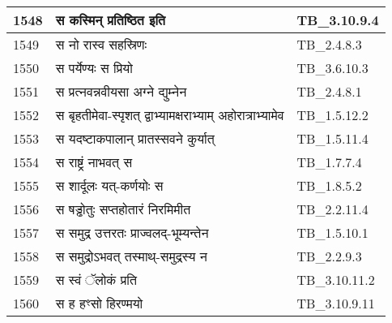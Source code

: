 \documentclass[17pt]{extarticle}
\begin{document}
\begin{longtable}{||p{0.4in}||p{4.9in}||p{0.9in}||}
    \hline
        
    1548 & स कस्मिन् प्रतिष्ठित इति & TB\_3.10.9.4       \\
    
    \hline
        
    1549 & स नो रास्व सहस्रिणः & TB\_2.4.8.3       \\
    
    \hline
        
    1550 & स पर्येण्यः स प्रियो & TB\_3.6.10.3       \\
    
    \hline
        
    1551 & स प्रत्नवन्नवीयसा अग्ने द्युम्नेन & TB\_2.4.8.1       \\
    
    \hline
        
    1552 & स बृहतीमेवा{-}स्पृशत् द्वाभ्यामक्षराभ्याम् अहोरात्राभ्यामेव & TB\_1.5.12.2       \\
    
    \hline
        
    1553 & स यदष्टाकपालान् प्रातस्सवने कुर्यात् & TB\_1.5.11.4       \\
    
    \hline
        
    1554 & स राष्ट्रं नाभवत् स & TB\_1.7.7.4       \\
    
    \hline
        
    1555 & स शार्दूलः यत्{-}कर्णयोः स & TB\_1.8.5.2       \\
    
    \hline
        
    1556 & स षड्ढोतुः सप्तहोतारं निरमिमीत & TB\_2.2.11.4       \\
    
    \hline
        
    1557 & स समुद्र उत्तरतः प्राज्वलद्{-}भूम्यन्तेन & TB\_1.5.10.1       \\
    
    \hline
        
    1558 & स समुद्रोऽभवत् तस्माथ्{-}समुद्रस्य न & TB\_2.2.9.3       \\
    
    \hline
        
    1559 & स स्वं ॅलोकं प्रति & TB\_3.10.11.2       \\
    
    \hline
        
    1560 & स ह हꣳसो हिरण्मयो & TB\_3.10.9.11       \\
    

\end{longtable}
\end{document}
